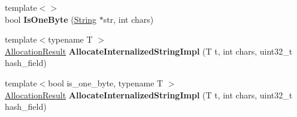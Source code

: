 \begin{DoxyCompactItemize}
\item 
{\footnotesize template$<$$>$ }\\bool {\bfseries Is\+One\+Byte} (\hyperlink{classv8_1_1internal_1_1_string}{String} $\ast$str, int chars)\hypertarget{classv8_1_1internal_1_1_heap_abf2a6238bd06d3ffd114cb61d76d7ee9}{}\label{classv8_1_1internal_1_1_heap_abf2a6238bd06d3ffd114cb61d76d7ee9}

\item 
{\footnotesize template$<$typename T $>$ }\\\hyperlink{classv8_1_1internal_1_1_allocation_result}{Allocation\+Result} {\bfseries Allocate\+Internalized\+String\+Impl} (T t, int chars, uint32\+\_\+t hash\+\_\+field)\hypertarget{classv8_1_1internal_1_1_heap_a303d478fd72251f203850262c5b2607c}{}\label{classv8_1_1internal_1_1_heap_a303d478fd72251f203850262c5b2607c}

\item 
{\footnotesize template$<$bool is\+\_\+one\+\_\+byte, typename T $>$ }\\\hyperlink{classv8_1_1internal_1_1_allocation_result}{Allocation\+Result} {\bfseries Allocate\+Internalized\+String\+Impl} (T t, int chars, uint32\+\_\+t hash\+\_\+field)\hypertarget{classv8_1_1internal_1_1_heap_a74daa60c3919932f9fa381901a96ca13}{}\label{classv8_1_1internal_1_1_heap_a74daa60c3919932f9fa381901a96ca13}

\end{DoxyCompactItemize}

